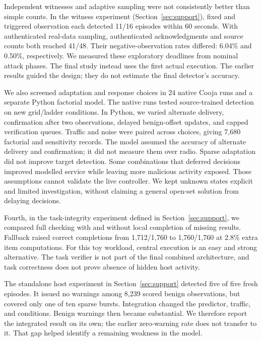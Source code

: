 \documentclass[journal]{IEEEtran}
\begin{document}
Independent witnesses and adaptive sampling were not consistently better than simple counts. In the witness experiment (Section~\ref{sec:support}), fixed and triggered observation each detected 11/16 episodes within 60 seconds. With authenticated real-data sampling, authenticated acknowledgments and source counts both reached 41/48. Their negative-observation rates differed: 6.04\% and 0.50\%, respectively. We measured these exploratory deadlines from nominal attack phases. The final study instead uses the first actual execution. The earlier results guided the design; they do not estimate the final detector's accuracy.

We also screened adaptation and response choices in 24 native Cooja runs and a separate Python factorial model. The native runs tested source-trained detection on new grid/ladder conditions. In Python, we varied alternate delivery, confirmation after two observations, delayed benign-offset updates, and capped verification queues. Traffic and noise were paired across choices, giving 7,680 factorial and sensitivity records. The model assumed the accuracy of alternate delivery and confirmation; it did not measure them over radio. Sparse adaptation did not improve target detection. Some combinations that deferred decisions improved modelled service while leaving more malicious activity exposed. Those assumptions cannot validate the live controller. We kept unknown states explicit and limited investigation, without claiming a general open-set solution from delaying decisions.

Fourth, in the task-integrity experiment defined in Section~\ref{sec:support}, we compared full checking with and without local completion of missing results. Fallback raised correct completions from 1,712/1,760 to 1,760/1,760 at 2.8\% extra item computations. For this toy workload, central execution is an easy and strong alternative. The task verifier is not part of the final combined architecture, and task correctness does not prove absence of hidden host activity.

The standalone host experiment in Section~\ref{sec:support} detected five of five fresh episodes. It issued no warnings among 8,239 scored benign observations, but covered only one of ten sparse bursts. Integration changed the predictor, traffic, and conditions. Benign warnings then became substantial. We therefore report the integrated result on its own; the earlier zero-warning rate does not transfer to it. That gap helped identify a remaining weakness in the model.
\end{document}
